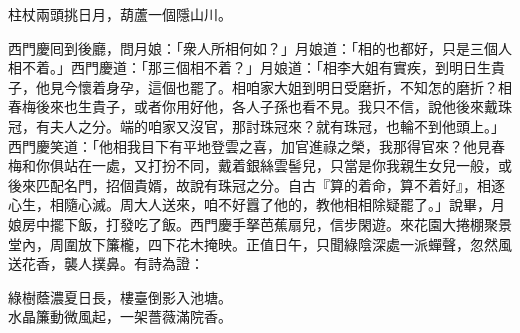 \begin{myquote}
柱杖兩頭挑日月，葫蘆一個隱山川。
\end{myquote}

西門慶囘到後廳，問月娘：「衆人所相何如？」月娘道：「相的也都好，只是三個人相不着。」西門慶道：「那三個相不着？」月娘道：「相李大姐有實疾，到明日生貴子，他見今懷着身孕，這個也罷了。相咱家大姐到明日受磨折，不知怎的磨折？相春梅後來也生貴子，或者你用好他，各人子孫也看不見。我只不信，說他後來戴珠冠，有夫人之分。端的咱家又沒官，那討珠冠來？就有珠冠，也輪不到他頭上。」西門慶笑道：「他相我目下有平地登雲之喜，加官進祿之榮，我那得官來？他見春梅和你俱站在一處，又打扮不同，戴着銀絲雲髻兒，只當是你我親生女兒一般，或後來匹配名門，招個貴婿，故說有珠冠之分。{}自古『算的着命，算不着好』，相逐心生，相隨心滅。周大人送來，咱不好囂了他的，教他相相除疑罷了。」說畢，月娘房中擺下飯，打發吃了飯。西門慶手拏芭蕉扇兒，信步閑遊。來花園大捲棚聚景堂內，周圍放下簾櫳，四下花木掩映。正值日午，只聞綠陰深處一派蟬聲，忽然風送花香，襲人撲鼻。有詩為證：

\begin{myquote}
綠樹蔭濃夏日長，樓臺倒影入池塘。\\水晶簾動微風起，一架薔薇滿院香。
\end{myquote}


